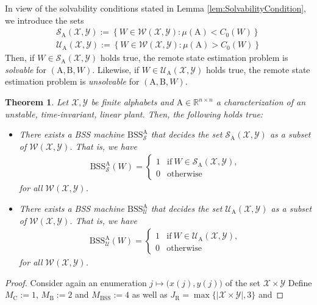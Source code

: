 \documentclass[conference]{IEEEtran}
\def\X{{\mathcal X}}
\def\Y{{\mathcal Y}}
\def\W{{\mathcal W}}
\def\S{{\mathcal S}}
\def\U{{\mathcal U}}
\def\RR{{\mathbb R}}
\def\mA{\bm{\mathrm{A}}}
\def\mB{\bm{\mathrm{B}}}
\newcommand{\BSS}{\mathrm{BSS}}
\newtheorem{Theorem}{Theorem}
\begin{document}
	In view of the solvability conditions stated in Lemma \ref{lem:SolvabilityCondition}, we introduce the sets
	\begin{align*}	\S_{\mA}(\X,\Y) := \left\{ W\in \W(\X,\Y) : \mu(\mA) < C_0(W) \right\} \\ 
					\U_{\mA}(\X,\Y) := \left\{ W\in \W(\X,\Y) : \mu(\mA) > C_0(W) \right\} 
	\end{align*}
	Then, if \(W\in \S_{\mA}(\X,\Y)\) holds true, the remote state estimation problem is \emph{solvable} for \((\mA,\mB, W)\).
	Likewise, if \(W\in \U_{\mA}(\X,\Y)\) holds true, the remote state estimation problem is \emph{unsolvable} for \((\mA,\mB, W)\).
	\begin{Theorem}	\label{thm:RemoteStateEstimationBSSDecidable}
					Let \(\X,\Y\) be finite alphabets and \(\mA \in \RR^{n\times n}\) a characterization of an unstable, time-invariant, 
					linear plant. Then, the following holds true:
					\begin{itemize}	\item There exists a BSS machine \(\BSS_{\S}^{\mA}\) that \emph{decides} the set
										\(\S_{\mA}(\X,\Y)\) as a subset of \(\W(\X,\Y)\). That is, we have
										\begin{align*}	\BSS_{\S}^{\mA}(W) = 	\begin{cases}	1 &\text{if}~ W\in \S_{\mA}(\X,\Y), \\
																								0 &\text{otherwise}
																				\end{cases}
										\end{align*}
										for all \(\W(\X,\Y)\).
									\item There exists a BSS machine \(\BSS_{\U}^{\mA}\) that \emph{decides} the set
										\(\U_{\mA}(\X,\Y)\) as a subset of \(\W(\X,\Y)\). That is, we have
										\begin{align*}	\BSS_{\U}^{\mA}(W) = 	\begin{cases}	1 &\text{if}~ W\in \U_{\mA}(\X,\Y), \\
																								0 &\text{otherwise}
																				\end{cases}
										\end{align*}
										for all \(\W(\X,\Y)\).
					\end{itemize}
	\end{Theorem}\begin{proof}
					Consider again an enumeration \(j \mapsto \big(x(j), y(j)\big)\) of the set \(\X\times\Y\) 
					Define \(M_\mathrm{C} := 1\), \(M_\mathrm{B} := 2\) and \(M_\BSS := 4\) as well as \(J_\mathrm{R} = \max\{|\X\times \Y|,3\}\) and 

\end{proof}
\end{document}
